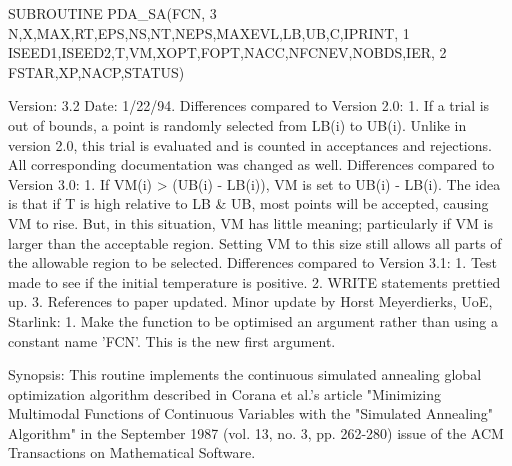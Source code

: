 \documentclass[11pt,twoside,nolof]{starlink}
\begin{document}
\begin{terminalv}
      SUBROUTINE PDA_SA(FCN,
     3              N,X,MAX,RT,EPS,NS,NT,NEPS,MAXEVL,LB,UB,C,IPRINT,
     1              ISEED1,ISEED2,T,VM,XOPT,FOPT,NACC,NFCNEV,NOBDS,IER,
     2              FSTAR,XP,NACP,STATUS)


  Version: 3.2
  Date: 1/22/94.
  Differences compared to Version 2.0:
     1. If a trial is out of bounds, a point is randomly selected
        from LB(i) to UB(i). Unlike in version 2.0, this trial is
        evaluated and is counted in acceptances and rejections.
        All corresponding documentation was changed as well.
  Differences compared to Version 3.0:
     1. If VM(i) > (UB(i) - LB(i)), VM is set to UB(i) - LB(i).
        The idea is that if T is high relative to LB & UB, most
        points will be accepted, causing VM to rise. But, in this
        situation, VM has little meaning; particularly if VM is
        larger than the acceptable region. Setting VM to this size
        still allows all parts of the allowable region to be selected.
  Differences compared to Version 3.1:
     1. Test made to see if the initial temperature is positive.
     2. WRITE statements prettied up.
     3. References to paper updated.
  Minor update by Horst Meyerdierks, UoE, Starlink:
     1. Make the function to be optimised an argument rather than using
        a constant name 'FCN'. This is the new first argument.

  Synopsis:
  This routine implements the continuous simulated annealing global
  optimization algorithm described in Corana et al.'s article
  "Minimizing Multimodal Functions of Continuous Variables with the
  "Simulated Annealing" Algorithm" in the September 1987 (vol. 13,
  no. 3, pp. 262-280) issue of the ACM Transactions on Mathematical
  Software.


\end{terminalv}
\end{document}
